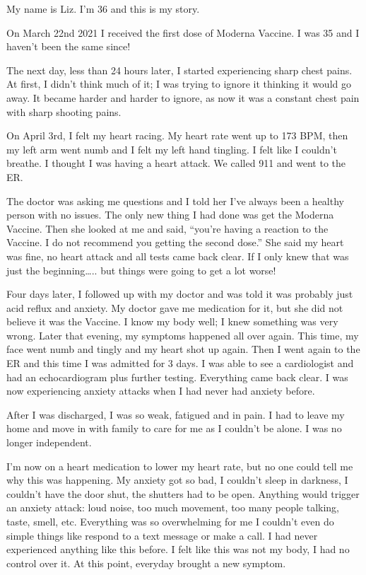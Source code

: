 My name is Liz. I’m 36 and this is my story.

On March 22nd 2021 I received the first dose of Moderna Vaccine. I was 35 and I
haven’t been the same since!

The next day, less than 24 hours later, I started experiencing sharp chest
pains. At first, I didn’t think much of it; I was trying to ignore it thinking
it would go away. It became harder and harder to ignore, as now it was a
constant chest pain with sharp shooting pains.

On April 3rd, I felt my heart racing. My heart rate went up to 173 BPM, then my
left arm went numb and I felt my left hand tingling. I felt like I couldn’t
breathe. I thought I was having a heart attack. We called 911 and went to the
ER.

The doctor was asking me questions and I told her I’ve always been a healthy
person with no issues. The only new thing I had done was get the Moderna
Vaccine. Then she looked at me and said, “you’re having a reaction to the
Vaccine. I do not recommend you getting the second dose.” She said my heart was
fine, no heart attack and all tests came back clear. If I only knew that was
just the beginning….. but things were going to get a lot worse!

Four days later, I followed up with my doctor and was told it was probably just
acid reflux and anxiety. My doctor gave me medication for it, but she did not
believe it was the Vaccine. I know my body well; I knew something was very
wrong. Later that evening, my symptoms happened all over again. This time, my
face went numb and tingly and my heart shot up again. Then I went again to the
ER and this time I was admitted for 3 days. I was able to see a cardiologist and
had an echocardiogram plus further testing. Everything came back clear. I was
now experiencing anxiety attacks when I had never had anxiety before.

After I was discharged, I was so weak, fatigued and in pain. I had to leave my
home and move in with family to care for me as I couldn’t be alone. I was no
longer independent.

I’m now on a heart medication to lower my heart rate, but no one could tell me
why this was happening. My anxiety got so bad, I couldn’t sleep in darkness, I
couldn’t have the door shut, the shutters had to be open. Anything would trigger
an anxiety attack: loud noise, too much movement, too many people talking,
taste, smell, etc. Everything was so overwhelming for me I couldn’t even do
simple things like respond to a text message or make a call. I had never
experienced anything like this before. I felt like this was not my body, I had
no control over it. At this point, everyday brought a new symptom.

